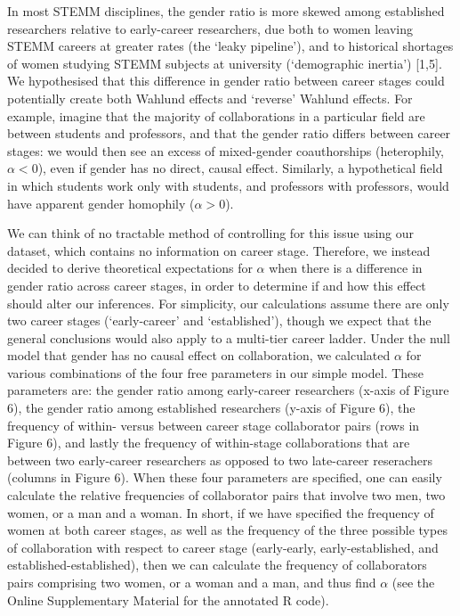 \documentclass[12pt,]{article}
\begin{document}
In most STEMM disciplines, the gender ratio is more skewed among
established researchers relative to early-career researchers, due both
to women leaving STEMM careers at greater rates (the `leaky pipeline'),
and to historical shortages of women studying STEMM subjects at
university (`demographic inertia') {[}1,5{]}. We hypothesised that this
difference in gender ratio between career stages could potentially
create both Wahlund effects and `reverse' Wahlund effects. For example,
imagine that the majority of collaborations in a particular field are
between students and professors, and that the gender ratio differs
between career stages: we would then see an excess of mixed-gender
coauthorships (heterophily, \(\alpha < 0\)), even if gender has no
direct, causal effect. Similarly, a hypothetical field in which students
work only with students, and professors with professors, would have
apparent gender homophily (\(\alpha > 0\)).

We can think of no tractable method of controlling for this issue using
our dataset, which contains no information on career stage. Therefore,
we instead decided to derive theoretical expectations for \(\alpha\)
when there is a difference in gender ratio across career stages, in
order to determine if and how this effect should alter our inferences.
For simplicity, our calculations assume there are only two career stages
(`early-career' and `established'), though we expect that the general
conclusions would also apply to a multi-tier career ladder. Under the
null model that gender has no causal effect on collaboration, we
calculated \(\alpha\) for various combinations of the four free
parameters in our simple model. These parameters are: the gender ratio
among early-career researchers (x-axis of Figure 6), the gender ratio
among established researchers (y-axis of Figure 6), the frequency of
within- versus between career stage collaborator pairs (rows in Figure
6), and lastly the frequency of within-stage collaborations that are
between two early-career researchers as opposed to two late-career
reserachers (columns in Figure 6). When these four parameters are
specified, one can easily calculate the relative frequencies of
collaborator pairs that involve two men, two women, or a man and a
woman. In short, if we have specified the frequency of women at both
career stages, as well as the frequency of the three possible types of
collaboration with respect to career stage (early-early,
early-established, and established-established), then we can calculate
the frequency of collaborators pairs comprising two women, or a woman
and a man, and thus find \(\alpha\) (see the Online Supplementary
Material for the annotated R code).
\end{document}
